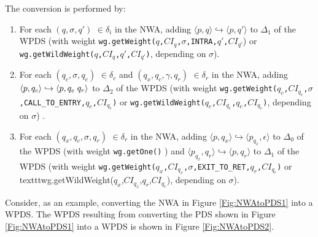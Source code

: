 \noindent The conversion is performed by:

\begin{enumerate}

\item For each $(q,\sigma,q')$ $\in \delta_i$ in the NWA, adding $\langle p,q
  \rangle \hookrightarrow \langle p,q' \rangle$ to $\Delta_1$ of the WPDS
  (with weight
  \texttt{wg.getWeight($q$,$CI_q$,$\sigma$,INTRA,$q'$,$CI_{q'}$}) or
  \texttt{wg.getWildWeight($q$,$CI_q$,$q'$,$CI_{q'}$)}, depending on
  $\sigma$).

\item For each $(q_c,\sigma, q_e)$ $\in \delta_c$ and $(q_x,q_c,\gamma,q_r)$
  $\in \delta_r$ in the NWA, adding $\langle p,q_c \rangle \hookrightarrow
  \langle p, q_e \hspace{.1cm} q_r \rangle$ to $\Delta_2$ of the WPDS (with
  weight
  \texttt{wg.getWeight($q_c$,$CI_{q_c}$,$\sigma$,CALL\_TO\_ENTRY,$q_e$,$CI_{q_e}$)}
  or \texttt{wg.getWildWeight($q_c$,$CI_{q_c}$,$q_e$,$CI_{q_e}$)}, depending
  on $\sigma$) .

\item For each $(q_x,q_c,\sigma,q_r)$ $\in \delta_r$ in the NWA, adding
  $\langle p,q_x \rangle \hookrightarrow \langle p_{q_x},\epsilon \rangle$ to
  $\Delta_0$ of the WPDS (with weight \texttt{wg.getOne()} ) and $\langle
  p_{q_x},q_r \rangle \hookrightarrow \langle p,q_r \rangle$ to $\Delta_1$ of
  the WPDS (with weight
  \texttt{wg.getWeight($q_x$,$CI_{q_x}$,$\sigma$,EXIT\_TO\_RET,$q_r$,$CI_{q_r}$)}
  or texttt{wg.getWildWeight($q_x$,$CI_{q_x}$,$q_r$,$CI_{q_r}$)}, depending
  on $\sigma$).

\end{enumerate}

\noindent Consider, as an example, converting the NWA in Figure
\ref{Fig:NWAtoPDS1} into a WPDS.  The WPDS resulting from converting the PDS
shown in Figure \ref{Fig:NWAtoPDS1} into a WPDS is shown in Figure
\ref{Fig:NWAtoPDS2}. \\

